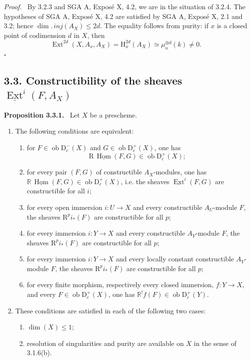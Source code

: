 \documentclass[11pt]{article}
\providecommand{\Hh}{\mathrm{H}}
\providecommand{\uExt}{\underline{\Ext}}
\providecommand{\qedtext}{\hfill$\square$}
\newenvironment{statement}[1]{\par\medskip\noindent\textbf{#1.}\ }{\par\medskip}
\newenvironment{prooftext}[1][Proof]{\par\noindent\emph{#1.}\ }{\par\medskip}
\DeclareMathOperator{\Hom}{Hom}
\DeclareMathOperator{\Ext}{Ext}
\newcommand{\R}{\mathrm{R}}
\newcommand{\D}{\mathrm{D}}
\newcommand{\ob}{\operatorname{ob}}
\providecommand{\Hom}{\operatorname{Hom}}
\providecommand{\ob}{\operatorname{ob}}
\providecommand{\R}{\mathrm R}
\providecommand{\Hom}{\operatorname{Hom}}
\providecommand{\qedtext}{\hfill$\square$}
\begin{document}
\begin{prooftext}
By 3.2.3 and SGA A, Exposé X, 4.2, we are in the situation of 3.2.4. The hypotheses of SGA A, Exposé X, 4.2 are satisfied by SGA A, Exposé X, 2.1 and 3.2; hence $\dim.\,inj(A_X)\le2d$. The equality follows from purity: if $x$ is a closed point of codimension $d$ in $X$, then
\[
   \Ext^{2d}(X,A_x,A_X)=\Hh^{2d}_x(A_X)
      \simeq\mu_n^{\otimes d}(k)\ne0.
\]
\qedtext
\end{prooftext}

\subsection*{3.3. Constructibility of the sheaves $\uExt^i(F,A_X)$}

\begin{statement}{Proposition 3.3.1}
Let $X$ be a prescheme.
\begin{enumerate}[label=\alph*)]
\item The following conditions are equivalent:
\begin{enumerate}[label=(\roman*)]
\item for $F\in\ob\D_c^-(X)$ and $G\in\ob\D_c^+(X)$, one has
\[
   \R\,\underline{\Hom}(F,G)\in\ob\D_c^+(X);
\]
\item[(i bis)] for every pair $(F,G)$ of constructible $A_X$-modules, one has $\mathbb{R}\,\underline{\Hom}(F,G)\in\ob\D_c^+(X)$, i.e. the sheaves $\uExt^i(F,G)$ are constructible for all $i$;
\item for every open immersion $i:U\to X$ and every constructible $A_U$-module $F$, the sheaves $\R^pi_*(F)$ are constructible for all $p$;
\item[(ii bis)] for every immersion $i:Y\to X$ and every constructible $A_Y$-module $F$, the sheaves $\R^pi_*(F)$ are constructible for all $p$;
\item[(ii ter)] for every immersion $i:Y\to X$ and every locally constant constructible $A_Y$-module $F$, the sheaves $\R^pi_*(F)$ are constructible for all $p$;
\item for every finite morphism, respectively every closed immersion, $f:Y\to X$, and every $F\in\ob\D_c^+(X)$, one has $\mathbb{R}^!f(F)\in\ob\D_c^+(Y)$.
\end{enumerate}
\item These conditions are satisfied in each of the following two cases:
\begin{enumerate}[label=(\roman*)]
\item $\dim(X)\le1$;
\item resolution of singularities and purity are available on $X$ in the sense of 3.1.6(b).
\end{enumerate}
\end{enumerate}
\end{statement}
\end{document}
